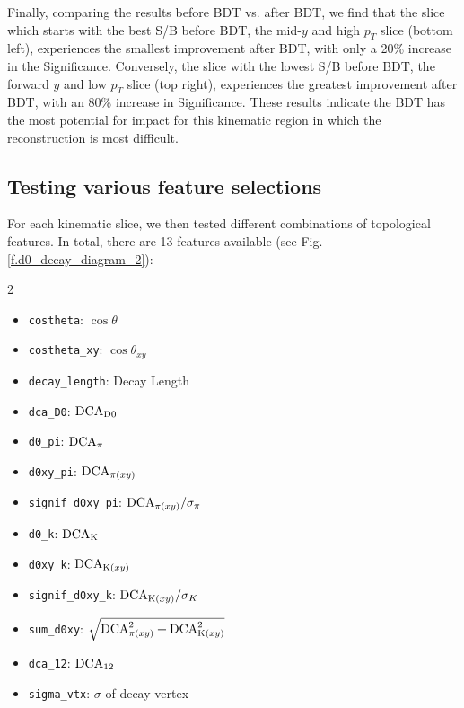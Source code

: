 Finally, comparing the results before BDT vs. after BDT, we find that the slice which starts with the best S/B before BDT, the mid-$y$ and high $p_T$ slice (bottom left), experiences the smallest improvement after BDT, with only a 20\% increase in the Significance. Conversely, the slice with the lowest S/B before BDT, the forward $y$ and low $p_T$ slice (top right), experiences the greatest improvement after BDT, with an 80\% increase in Significance. These results indicate the BDT has the most potential for impact for this kinematic region in which the reconstruction is most difficult.

\subsection{Testing various feature selections}
\label{sec.results_features}

For each kinematic slice, we then tested different combinations of topological features. In total, there are 13 features available (see Fig. \ref{f.d0_decay_diagram_2}):
\begin{multicols}{2}
\begin{itemize}
    \item \texttt{costheta}: $\cos{\theta}$
    \item \texttt{costheta\_xy}: $\cos{\theta_{xy}}$
    \item \texttt{decay\_length}: Decay Length
    \item \texttt{dca\_D0}: ${\rm DCA_{D0}}$
    \item \texttt{d0\_pi}: ${\rm DCA_\pi}$
    \item \texttt{d0xy\_pi}: ${\rm DCA}_{{\rm\pi}(xy)}$
    \item \texttt{signif\_d0xy\_pi}: ${\rm DCA}_{{\rm\pi}(xy)}/\sigma_\pi$
    \item \texttt{d0\_k}: ${\rm DCA_K}$
    \item \texttt{d0xy\_k}: ${\rm DCA}_{{\rm K}(xy)}$
    \item \texttt{signif\_d0xy\_k}: ${\rm DCA}_{{\rm K}(xy)}/\sigma_K$
    \item \texttt{sum\_d0xy}: $\sqrt{{\rm DCA}^2_{{\rm \pi}(xy)}+{\rm DCA}^2_{{\rm K}(xy)}}$
    \item \texttt{dca\_12}: ${\rm DCA_{12}}$
    \item \texttt{sigma\_vtx}: $\sigma$ of decay vertex
\end{itemize}
\end{multicols}

